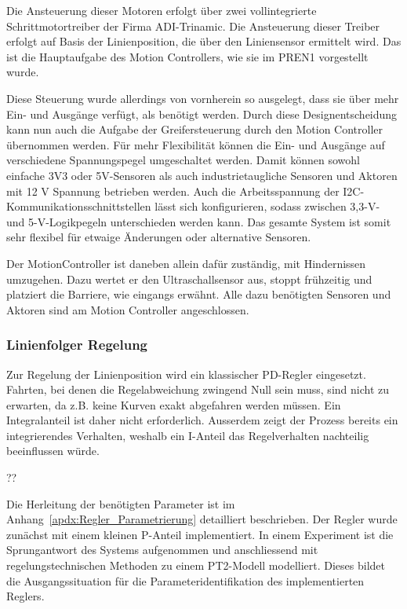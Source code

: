 \documentclass[main.tex]{subfiles} %
\begin{document}
Die Ansteuerung dieser Motoren erfolgt über zwei vollintegrierte
Schrittmotortreiber der Firma ADI-Trinamic. Die Ansteuerung dieser Treiber
erfolgt auf Basis der Linienposition, die über den Liniensensor ermittelt wird.
Das ist die Hauptaufgabe des Motion Controllers, wie sie im PREN1 vorgestellt
wurde.

Diese Steuerung wurde allerdings von vornherein so ausgelegt, dass sie über
mehr Ein- und Ausgänge verfügt, als benötigt werden. Durch diese
Designentscheidung kann nun auch die Aufgabe der Greifersteuerung durch den
Motion Controller übernommen werden. Für mehr Flexibilität können die Ein- und
Ausgänge auf verschiedene Spannungspegel umgeschaltet werden. Damit können
sowohl einfache 3V3 oder 5V-Sensoren als auch industrietaugliche Sensoren und
Aktoren mit 12 V Spannung betrieben werden. Auch die Arbeitsspannung der
I2C-Kommunikationsschnittstellen lässt sich konfigurieren, sodass zwischen
3,3-V- und 5-V-Logikpegeln unterschieden werden kann. Das gesamte System ist
somit sehr flexibel für etwaige Änderungen oder alternative Sensoren.

Der MotionController ist daneben allein dafür zuständig, mit Hindernissen
umzugehen. Dazu wertet er den Ultraschallsensor aus, stoppt frühzeitig und
platziert die Barriere, wie eingangs erwähnt. Alle dazu benötigten Sensoren und
Aktoren sind am Motion Controller angeschlossen.

\subsubsection{Linienfolger Regelung}

Zur Regelung der Linienposition wird ein klassischer PD-Regler eingesetzt.
Fahrten, bei denen die Regelabweichung zwingend Null sein muss, sind nicht zu
erwarten, da z.B. keine Kurven exakt abgefahren werden müssen. Ein
Integralanteil ist daher nicht erforderlich. Ausserdem zeigt der Prozess
bereits ein integrierendes Verhalten, weshalb ein I-Anteil das Regelverhalten
nachteilig beeinflussen würde.

??

Die Herleitung der benötigten Parameter ist im
Anhang~\ref{apdx:Regler_Parametrierung} detailliert beschrieben. Der Regler
wurde zunächst mit einem kleinen P-Anteil implementiert. In einem Experiment
ist die Sprungantwort des Systems aufgenommen und anschliessend mit
regelungstechnischen Methoden zu einem PT2-Modell modelliert. Dieses bildet die
Ausgangssituation für die Parameteridentifikation des implementierten Reglers.
\end{document}

